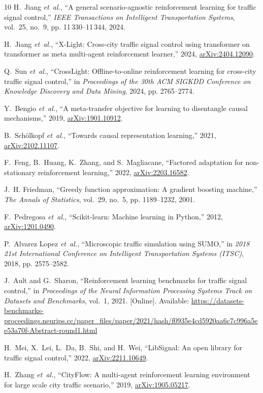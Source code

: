\documentclass[letterpaper,journal]{IEEEtran}
\begin{document}
\begin{thebibliography}{10}
H.~Jiang \emph{et~al.}, ``A general
  scenario-agnostic reinforcement learning for traffic signal control,''
  \emph{IEEE Transactions on Intelligent Transportation Systems}, vol.~25,
  no.~9, pp. 11\,330--11\,344, 2024.

H.~Jiang \emph{et~al.}, ``{X-Light}: Cross-city traffic signal control using transformer on transformer as meta multi-agent reinforcement learner,''
  2024, \href{https://arxiv.org/abs/2404.12090}{arXiv:2404.12090}.

Q.~Sun \emph{et~al.}, ``{CrossLight}:
  Offline-to-online reinforcement learning for cross-city traffic signal
  control,'' in \emph{Proceedings of the 30th ACM SIGKDD Conference on
  Knowledge Discovery and Data Mining}, 2024, pp. 2765--2774.

Y.~Bengio \emph{et~al.}, ``A meta-transfer objective for learning to disentangle causal mechanisms,''
  2019, \href{https://arxiv.org/abs/1901.10912}{arXiv:1901.10912}.

B.~Sch{\"o}lkopf \emph{et~al.}, ``Towards causal representation learning,''
  2021, \href{https://arxiv.org/abs/2102.11107}{arXiv:2102.11107}.

F.~Feng, B.~Huang, K.~Zhang, and S.~Magliacane, ``Factored adaptation for non-stationary reinforcement learning,''
  2022, \href{https://arxiv.org/abs/2203.16582}{arXiv:2203.16582}.

J.~H. Friedman, ``Greedy function approximation: A gradient boosting machine,''
  \emph{The Annals of Statistics}, vol.~29, no.~5, pp. 1189--1232, 2001.

F.~Pedregosa \emph{et~al.}, ``Scikit-learn: Machine learning in {Python},''
  2012, \href{https://arxiv.org/abs/1201.0490}{arXiv:1201.0490}.

P.~Alvarez Lopez \emph{et~al.}, ``Microscopic traffic simulation using {SUMO},'' in \emph{2018 21st
  International Conference on Intelligent Transportation Systems (ITSC)}, 2018,
  pp. 2575--2582.

\BIBentryALTinterwordspacing
J.~Ault and G.~Sharon, ``Reinforcement learning benchmarks for traffic signal
  control,'' in \emph{Proceedings of the Neural Information Processing Systems
  Track on Datasets and Benchmarks}, vol.~1, 2021. [Online]. Available:
  \url{https://datasets-benchmarks-proceedings.neurips.cc/paper_files/paper/2021/hash/f0935e4cd5920aa6c7c996a5ee53a70f-Abstract-round1.html}
\BIBentrySTDinterwordspacing

H.~Mei, X.~Lei, L.~Da, B.~Shi, and H.~Wei, ``{LibSignal}: An open library for traffic signal control,''
  2022, \href{https://arxiv.org/abs/2211.10649}{arXiv:2211.10649}.

H.~Zhang \emph{et~al.}, ``{CityFlow}: A multi-agent reinforcement learning environment for large scale city traffic scenario,''
  2019, \href{https://arxiv.org/abs/1905.05217}{arXiv:1905.05217}.

\end{thebibliography}
\end{document}
